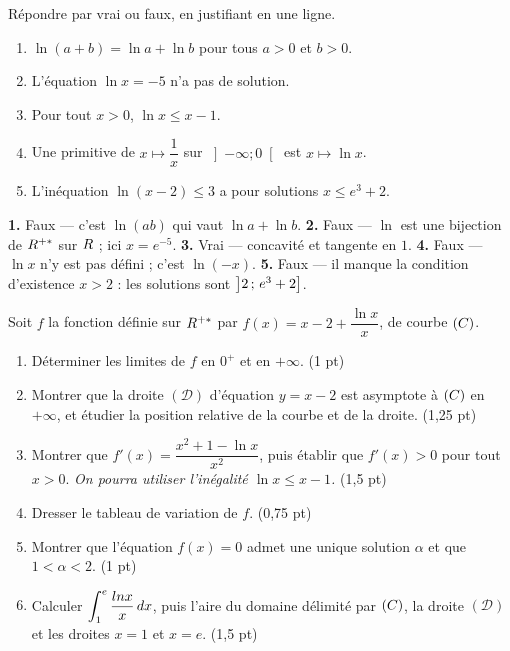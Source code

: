 \begin{jemeteste}
Répondre par vrai ou faux, en justifiant en une ligne.

\begin{enumerate}[label=\textbf{\arabic*.}, leftmargin=*, itemsep=0.28em]
  \item $\ln(a+b) = \ln a + \ln b$ pour tous $a>0$ et $b>0$.
  \item L'équation $\ln x = -5$ n'a pas de solution.
  \item Pour tout $x>0$, $\ln x \leq x-1$.
  \item Une primitive de $x \mapsto \dfrac{1}{x}$ sur $\left]-\infty;0\right[$
        est $x \mapsto \ln x$.
  \item L'inéquation $\ln(x-2) \leq 3$ a pour solutions $x \leq e^{3}+2$.
\end{enumerate}
\end{jemeteste}

\begin{corrige}[je me teste]
\textbf{1.} Faux — c'est $\ln(ab)$ qui vaut $\ln a + \ln b$.
\textbf{2.} Faux — $\ln$ est une bijection de $R^{+*}$ sur $R$ ; ici
$x = e^{-5}$.
\textbf{3.} Vrai — concavité et tangente en $1$.
\textbf{4.} Faux — $\ln x$ n'y est pas défini ; c'est $\ln(-x)$.
\textbf{5.} Faux — il manque la condition d'existence $x>2$ : les solutions
sont $\left]2\,;\,e^{3}+2\right]$.
\end{corrige}

\begin{commeaubac}
Soit $f$ la fonction définie sur $R^{+*}$ par
$f(x) = x - 2 + \dfrac{\ln x}{x}$, de courbe $(C)$.

\begin{enumerate}[label=\textbf{\arabic*.}, leftmargin=*, itemsep=0.25em]
  \item Déterminer les limites de $f$ en $0^{+}$ et en $+\infty$.
        \hfill\textup{(1 pt)}
  \item Montrer que la droite $(\mathscr{D})$ d'équation $y = x-2$ est
        asymptote à $(C)$ en $+\infty$, et étudier la position relative de la
        courbe et de la droite. \hfill\textup{(1,25 pt)}
  \item Montrer que $f'(x) = \dfrac{x^{2}+1-\ln x}{x^{2}}$, puis établir que
        $f'(x)>0$ pour tout $x>0$. \emph{On pourra utiliser l'inégalité
        $\ln x \leq x-1$.} \hfill\textup{(1,5 pt)}
  \item Dresser le tableau de variation de $f$. \hfill\textup{(0,75 pt)}
  \item Montrer que l'équation $f(x)=0$ admet une unique solution $\alpha$ et
        que $1 < \alpha < 2$. \hfill\textup{(1 pt)}
  \item Calculer $\displaystyle\int_{1}^{e} \frac{ln x}{x}\,dx$, puis l'aire du
        domaine délimité par $(C)$, la droite $(\mathscr{D})$ et les droites
        $x=1$ et $x=e$. \hfill\textup{(1,5 pt)}
\end{enumerate}
\end{commeaubac}

